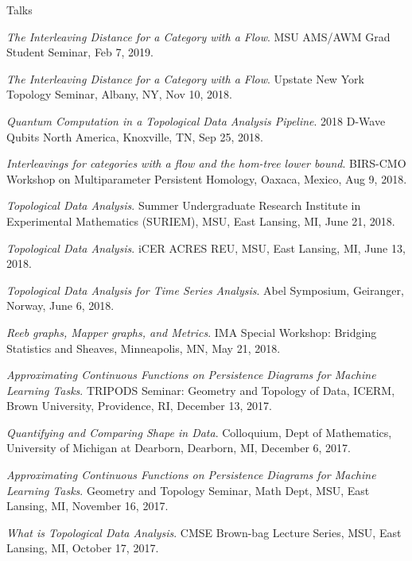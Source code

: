 \documentclass{resume} %
\begin{document}
\begin{rSection}{Talks}
\begin{etaremune}
\item\emph{The Interleaving Distance for a Category with a Flow}. MSU AMS/AWM Grad Student Seminar, Feb 7, 2019. 

\item\emph{The Interleaving Distance for a Category with a Flow}. Upstate New York Topology Seminar, Albany, NY, Nov 10, 2018. 

\item\emph{Quantum Computation in a Topological Data Analysis Pipeline}. 2018 D-Wave Qubits North America, Knoxville, TN, Sep 25, 2018. 

\item\emph{Interleavings for categories with a flow and the hom-tree lower bound}. BIRS-CMO Workshop on Multiparameter Persistent Homology, Oaxaca, Mexico, Aug 9, 2018. 

\item\emph{Topological Data Analysis}. Summer Undergraduate Research Institute in Experimental Mathematics (SURIEM), MSU, East Lansing, MI, June 21, 2018. 

\item\emph{Topological Data Analysis}. iCER ACRES REU, MSU, East Lansing, MI, June 13, 2018. 

\item\emph{Topological Data Analysis for Time Series Analysis}. Abel Symposium, Geiranger, Norway, June 6, 2018. 

\item\emph{Reeb graphs, Mapper graphs, and Metrics}. IMA Special Workshop: Bridging Statistics and Sheaves, Minneapolis, MN, May 21, 2018. 

\item\emph{Approximating Continuous Functions on Persistence Diagrams for Machine Learning Tasks}. TRIPODS Seminar: Geometry and Topology of Data, ICERM, Brown University, Providence, RI, December 13, 2017. 

\item\emph{Quantifying and Comparing Shape in Data}. Colloquium, Dept of Mathematics, University of Michigan at Dearborn, Dearborn, MI, December 6, 2017. 

\item\emph{Approximating Continuous Functions on Persistence Diagrams for Machine Learning Tasks}. Geometry and Topology Seminar, Math Dept, MSU, East Lansing, MI, November 16, 2017. 

\item\emph{What is Topological Data Analysis}. CMSE Brown-bag Lecture Series, MSU, East Lansing, MI, October 17, 2017. 


\end{etaremune}
\end{rSection}
\end{document}
